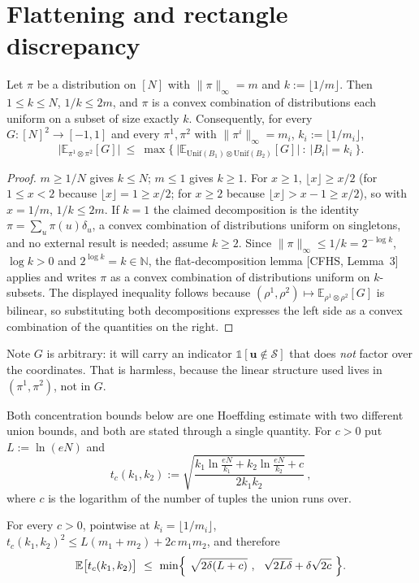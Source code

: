 \documentclass{aicr-solution}
\newcommand{\Exp}{\mathbb{E}}
\newcommand{\vu}{\mathbf{u}}
\newcommand{\ind}{\mathbb{1}}
\newcommand{\Unif}{\mathrm{Unif}}
\begin{document}
\section{Flattening and rectangle discrepancy}

\begin{lemma}[flattening]\label{lem:flat}
Let $\pi$ be a distribution on $[N]$ with $\|\pi\|_\infty=m$ and
$k:=\lfloor1/m\rfloor$. Then $1\le k\le N$, $1/k\le2m$, and $\pi$ is a convex
combination of distributions each uniform on a subset of size exactly $k$.
Consequently, for every $G:[N]^{2}\to[-1,1]$ and every $\pi^{1},\pi^{2}$ with
$\|\pi^{i}\|_\infty=m_i$, $k_i:=\lfloor1/m_i\rfloor$,
\[
  \bigl|\Exp_{\pi^{1}\otimes\pi^{2}}[G]\bigr|\ \le\
  \max\bigl\{\ \bigl|\Exp_{\Unif(B_1)\otimes\Unif(B_2)}[G]\bigr|\ :\ |B_i|=k_i\ \bigr\}.
\]
\end{lemma}

\begin{proof}
$m\ge1/N$ gives $k\le N$; $m\le1$ gives $k\ge1$. For $x\ge1$,
$\lfloor x\rfloor\ge x/2$ (for $1\le x<2$ because $\lfloor x\rfloor=1\ge x/2$;
for $x\ge2$ because $\lfloor x\rfloor>x-1\ge x/2$), so with $x=1/m$,
$1/k\le2m$. If $k=1$ the claimed decomposition is the identity
$\pi=\sum_u\pi(u)\delta_u$, a convex combination of distributions uniform on
singletons, and no external result is needed; assume $k\ge2$. Since
$\|\pi\|_\infty\le1/k=2^{-\log k}$, $\log k>0$ and $2^{\log k}=k\in\mathbb N$,
the flat-decomposition lemma [CFHS, Lemma~3] applies and writes $\pi$ as a convex
combination of distributions uniform on $k$-subsets. The displayed inequality
follows because $(\rho^1,\rho^2)\mapsto\Exp_{\rho^1\otimes\rho^2}[G]$ is
bilinear, so substituting both decompositions expresses the left side as a convex
combination of the quantities on the right.
\end{proof}

Note $G$ is arbitrary: it will carry an indicator $\ind[\vu\notin\mathcal S]$ that
does \emph{not} factor over the coordinates. That is harmless, because the linear
structure used lives in $(\pi^1,\pi^2)$, not in $G$.

Both concentration bounds below are one Hoeffding estimate with two different
union bounds, and both are stated through a single quantity. For $c>0$ put
$L:=\ln(eN)$ and
\[
  t_c(k_1,k_2):=\sqrt{\frac{k_1\ln\frac{eN}{k_1}+k_2\ln\frac{eN}{k_2}+c}{2k_1k_2}}\,,
\]
where $c$ is the logarithm of the number of tuples the union runs over.

\begin{lemma}\label{lem:mom}
For every $c>0$, pointwise at $k_i=\lfloor1/m_i\rfloor$,
$t_c(k_1,k_2)^{2}\le L(m_1+m_2)+2c\,m_1m_2$, and therefore
\[
  \Exp\bigl[t_c(k_1,k_2)\bigr]\ \le\
  \min\Bigl\{\ \sqrt{2\delta(L+c)}\ ,\ \ \sqrt{2L\delta}+\delta\sqrt{2c}\ \Bigr\}.
\]
\end{lemma}
\end{document}
